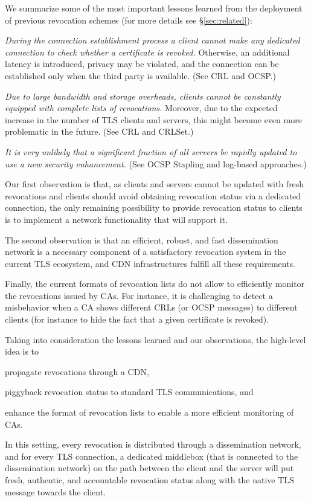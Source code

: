 We summarize some of the most important lessons learned from the deployment of
previous revocation schemes (for more details see \S\ref{sec:related}):
\begin{inparaenum}[\itshape 1)]
	\item \textit{During the connection establishment process a client cannot make
		any dedicated connection to check whether a certificate is revoked.}
    Otherwise, an additional latency is introduced, privacy may be violated, and
    the connection can be established only when the third party is available.
    (See CRL and OCSP.)
	\item \textit{Due to large bandwidth and storage overheads, clients cannot be
	  constantly equipped with complete lists of revocations.} Moreover, due to
    the expected increase in the number of TLS clients and servers, this might
    become even more problematic in the future. (See CRL and CRLSet.)
	\item \textit{It is very unlikely that a significant fraction of all servers
    be rapidly updated to use a new security enhancement.} (See OCSP Stapling
    and log-based approaches.)
\end{inparaenum}

Our first observation is that, as clients and servers cannot be updated with
fresh revocations and clients should avoid obtaining revocation status via a
dedicated connection, the only remaining possibility to provide revocation
status to clients is to implement a network functionality that will support it.

The second observation is that an efficient, robust, and fast dissemination
network is a necessary component of a satisfactory revocation system in the
current TLS ecosystem, and CDN infrastructures fulfill all these requirements.

Finally, the current formats of revocation lists do not allow to efficiently
monitor the revocations issued by CAs. For instance, it is challenging to detect
a misbehavior when a CA shows different CRLs (or OCSP messages) to different
clients (for instance to hide the fact that a given certificate is revoked).

Taking into consideration the lessons learned and our observations, the
high-level idea is to
\begin{inparaenum}[\itshape 1)]
  \item propagate revocations through a CDN,
  \item piggyback revocation status to standard TLS communications, and
  \item enhance the format of revocation lists to enable a more efficient
    monitoring of CAs.
\end{inparaenum}
In this setting, every revocation is distributed through a dissemination
network, and for every TLS connection, a dedicated middlebox (that is connected
to the dissemination network) on the path between the client and the server will
put fresh, authentic, and accountable revocation status along with the native
TLS message towards the client.


